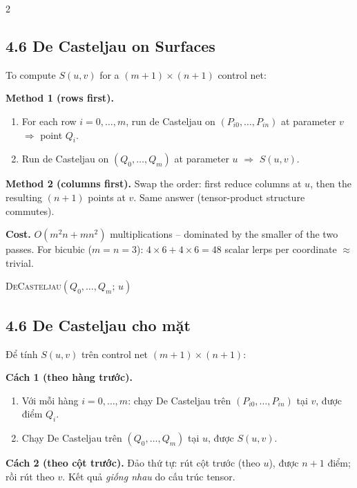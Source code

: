 \begin{paracol}{2}
\subsection*{4.6 De Casteljau on Surfaces}

To compute $S(u,v)$ for a $(m{+}1)\times(n{+}1)$ control net:

\textbf{Method 1 (rows first).}
\begin{enumerate}[leftmargin=*,nosep]
  \item For each row $i=0,\dots,m$, run de Casteljau on $(P_{i0},\dots,P_{in})$ at parameter $v$ $\Rightarrow$ point $Q_i$.
  \item Run de Casteljau on $(Q_0,\dots,Q_m)$ at parameter $u$ $\Rightarrow$ $S(u,v)$.
\end{enumerate}
\textbf{Method 2 (columns first).} Swap the order: first reduce columns at $u$, then the resulting $(n{+}1)$ points at $v$. Same answer (tensor-product structure commutes).

\medskip
\textbf{Cost.} $O(m^{2}n+mn^{2})$ multiplications -- dominated by the smaller of the two passes. For bicubic ($m=n=3$): $4\times 6+4\times 6=48$ scalar lerps per coordinate $\approx$ trivial.

\begin{algorithm}[H]
\small
\DontPrintSemicolon
{}
\Return \textsc{DeCasteljau}$(Q_0,\dots,Q_m;\,u)$\;
\caption{De Casteljau (surface, row-first)}
\end{algorithm}

\switchcolumn

\subsection*{4.6 De Casteljau cho mặt}

Để tính $S(u,v)$ trên control net $(m{+}1)\times(n{+}1)$:

\textbf{Cách 1 (theo hàng trước).}
\begin{enumerate}[leftmargin=*,nosep]
  \item Với mỗi hàng $i=0,\dots,m$: chạy De Casteljau trên $(P_{i0},\dots,P_{in})$ tại $v$, được điểm $Q_i$.
  \item Chạy De Casteljau trên $(Q_0,\dots,Q_m)$ tại $u$, được $S(u,v)$.
\end{enumerate}

\textbf{Cách 2 (theo cột trước).} Đảo thứ tự: rút cột trước (theo $u$), được $n{+}1$ điểm; rồi rút theo $v$. Kết quả \emph{giống nhau} do cấu trúc tensor.


\end{paracol}
